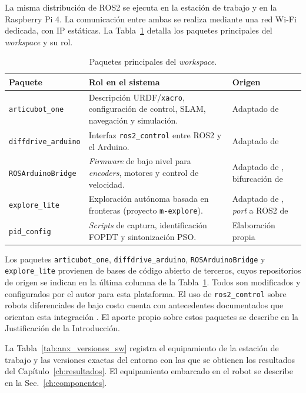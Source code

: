 \begin{appendices}
La misma distribución de \gls{ROS2} se ejecuta en la estación de trabajo y en la Raspberry Pi 4. La comunicación entre ambas se realiza mediante una red Wi-Fi dedicada, con IP estáticas. La Tabla~\ref{tab:anx_ws_roles} detalla los paquetes principales del \textit{workspace} y su rol.

\begin{table}[H]
\centering
\caption{Paquetes principales del \textit{workspace}.}
\label{tab:anx_ws_roles}
\small
\begin{tabular}{p{3.2cm} p{6.1cm} p{4.7cm}}
\toprule
\textbf{Paquete} & \textbf{Rol en el sistema} & \textbf{Origen} \\
\midrule
\texttt{articubot\_one} & Descripción URDF/\texttt{xacro}, configuración de control, SLAM, navegación y simulación. & Adaptado de \citep{newans_articubot} \\
\texttt{diffdrive\_arduino} & Interfaz \texttt{ros2\_control} entre \gls{ROS2} y el \gls{Arduino}. & Adaptado de \citep{newans_diffdrive} \\
\texttt{ROSArduinoBridge} & \textit{Firmware} de bajo nivel para \textit{encoders}, motores y control de velocidad. & Adaptado de \citep{newans_rosarduinobridge}, bifurcación de \citep{hbrobotics_rosarduinobridge} \\
\texttt{explore\_lite} & Exploración autónoma basada en fronteras (proyecto \texttt{m-explore}). & Adaptado de \citep{alvarez2021mexplore_ros2}, \textit{port} a \gls{ROS2} de \citep{horner_mexplore} \\
\texttt{pid\_config} & \textit{Scripts} de captura, identificación FOPDT y sintonización PSO. & Elaboración propia \\
\bottomrule
\end{tabular}
\end{table}

\noindent Los paquetes \texttt{articubot\_one}, \texttt{diffdrive\_arduino},
\texttt{ROSArduinoBridge} y \texttt{explore\_lite} provienen de bases de
código abierto de terceros, cuyos repositorios de origen se indican en la
última columna de la Tabla~\ref{tab:anx_ws_roles}. Todos son modificados
y configurados por el autor para esta plataforma. El uso de
\texttt{ros2\_control} sobre robots diferenciales de bajo costo cuenta con
antecedentes documentados que orientan esta integración
\citep{amadi2024introduction}. El aporte propio sobre estos paquetes se
describe en la Justificación de la Introducción.

La Tabla~\ref{tab:anx_versiones_sw} registra el equipamiento de la estación
de trabajo y las versiones exactas del entorno con las que se obtienen
los resultados del Capítulo~\ref{ch:resultados}. El equipamiento embarcado
en el robot se describe en la Sec.~\ref{ch:componentes}.


\end{appendices}
